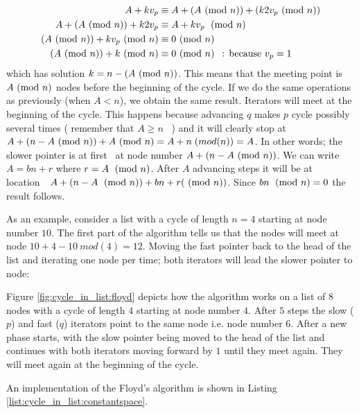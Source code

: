 \begin{align}
  A + kv_p &\equiv A + (A \ (\mathrm{mod}\ n)) + (k2v_p \ (\mathrm{mod}\ n)) \\
  A + (A \ (\mathrm{mod}\ n)) + k2v_p &\equiv A + kv_p\;\ (\mathrm{mod}\ n) \\
  (A \ (\mathrm{mod}\ n)) + kv_p \ (\mathrm{mod}\ n) & \equiv 0\ (\mathrm{mod}\ n) \\
  (A \ (\mathrm{mod}\ n)) + k \ (\mathrm{mod}\ n) &\equiv 0 \ (\mathrm{mod}\ n) \: \: \text{  : because  } v_p=1 \\
\end{align}
which has solution \(k = n-(A \ (\mathrm{mod}\ n))\). This means that the meeting point is \(A \ (\mathrm{mod}\ n)\) nodes
before the beginning of the cycle. If we do the same operations as previously (when \(A <
n\)), we obtain the same result. Iterators will meet at the beginning of the cycle. This happens because
advancing \(q\) makes \(p\) cycle possibly several times ( remember that \(A \geq n\)  ) and it will
clearly stop at \( A+(n-A \ (\mathrm{mod}\ n)) + A \ (\mathrm{mod}\ n) = A +n \;(mod (n))= A\).
In other words; the slower pointer is at first  at node number \(A+(n-A \ (\mathrm{mod}\ n))\). We can write \( A
= bn + r\) where \(r = A \;\ (\mathrm{mod}\ n)\). After \(A\) advancing steps it will be at location  \( A+(n-A
\;\ (\mathrm{mod}\ n)) +bn +r (\ (\mathrm{mod}\ n))\). Since \(bn \; \ (\mathrm{mod}\ n)=0\) the result follows.

As an example, consider a list with a cycle of length \(n=4\) starting at node number \(10\). The
first part of the algorithm tells us that the nodes will meet at node \(10 + 4 - 10 \: mod(4) =
12\). Moving the fast pointer back to the head of the list and iterating one node per time; both
iterators will lead the slower pointer to node:


Figure \ref{fig:cycle_in_list:floyd} depicts how the algorithm
works on a list of $8$ nodes with a cycle of length $4$ starting at node number $4$. 
After $5$ steps the slow ($p$) and fast ($q$) iterators point to the same node i.e. node number $6$. 
After a new phase starts, with the slow pointer being moved to the head of the list and continues with both iterators moving forward by $1$
until they meet again. 
They will meet again at the beginning of the cycle. 

An implementation of the Floyd's algorithm is shown in Listing \ref{list:cycle_in_list:constantspace}.




